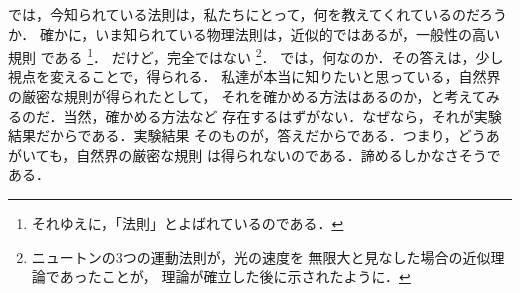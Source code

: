                 では，今知られている法則は，私たちにとって，何を教えてくれているのだろうか．
                確かに，いま知られている物理法則は，近似的ではあるが，一般性の高い規則
                である
                    \footnote{
                        それゆえに，「法則」とよばれているのである．
                    }．
                だけど，完全ではない
                    \footnote{
                        ニュートンの3つの運動法則が，光の速度を
                        無限大と見なした場合の近似理論であったことが，
                        理論が確立した後に示されたように．
                    }．
                では，何なのか．その答えは，少し視点を変えることで，得られる．
                私達が本当に知りたいと思っている，自然界の厳密な規則が得られたとして，
                それを確かめる方法はあるのか，と考えてみるのだ．当然，確かめる方法など
                存在するはずがない．なぜなら，それが実験結果だからである．実験結果
                そのものが，答えだからである．つまり，どうあがいても，自然界の厳密な規則
                は得られないのである．諦めるしかなさそうである．

